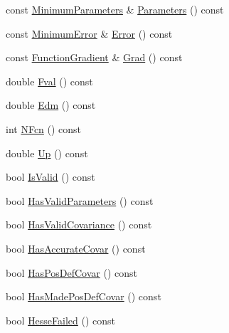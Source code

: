 \begin{DoxyCompactItemize}
\item 
const \mbox{\hyperlink{classROOT_1_1Minuit2_1_1MinimumParameters}{Minimum\+Parameters}} \& \mbox{\hyperlink{classROOT_1_1Minuit2_1_1BasicFunctionMinimum_acbbd51950f390d29541728f114b2d12e}{Parameters}} () const
\item 
const \mbox{\hyperlink{classROOT_1_1Minuit2_1_1MinimumError}{Minimum\+Error}} \& \mbox{\hyperlink{classROOT_1_1Minuit2_1_1BasicFunctionMinimum_a239c3ed3af4e3bc89b25014ec808e229}{Error}} () const
\item 
const \mbox{\hyperlink{classROOT_1_1Minuit2_1_1FunctionGradient}{Function\+Gradient}} \& \mbox{\hyperlink{classROOT_1_1Minuit2_1_1BasicFunctionMinimum_aa071637493e0d415db455c2eec0990c6}{Grad}} () const
\item 
double \mbox{\hyperlink{classROOT_1_1Minuit2_1_1BasicFunctionMinimum_a4ae5abf5eb1cfa1924abad45529e1ffd}{Fval}} () const
\item 
double \mbox{\hyperlink{classROOT_1_1Minuit2_1_1BasicFunctionMinimum_abecb5c249e988f6f3f792e2bcc11d4a4}{Edm}} () const
\item 
int \mbox{\hyperlink{classROOT_1_1Minuit2_1_1BasicFunctionMinimum_a1b73ebb29cc319f09fdd5a4408e703ba}{N\+Fcn}} () const
\item 
double \mbox{\hyperlink{classROOT_1_1Minuit2_1_1BasicFunctionMinimum_a576364a872f31ede72df956b103e0d6e}{Up}} () const
\item 
bool \mbox{\hyperlink{classROOT_1_1Minuit2_1_1BasicFunctionMinimum_a644f34dabb94b0b5bdc8f7b8bfa7ae4b}{Is\+Valid}} () const
\item 
bool \mbox{\hyperlink{classROOT_1_1Minuit2_1_1BasicFunctionMinimum_a91fedd04974dd5d27981eb758405670f}{Has\+Valid\+Parameters}} () const
\item 
bool \mbox{\hyperlink{classROOT_1_1Minuit2_1_1BasicFunctionMinimum_a2bf14deac281ae646e88a2fa6d0b5012}{Has\+Valid\+Covariance}} () const
\item 
bool \mbox{\hyperlink{classROOT_1_1Minuit2_1_1BasicFunctionMinimum_acc1e5d50ec4abe632af93c5dcebd9c0e}{Has\+Accurate\+Covar}} () const
\item 
bool \mbox{\hyperlink{classROOT_1_1Minuit2_1_1BasicFunctionMinimum_a82e819b720ca93301fdea10fc10af791}{Has\+Pos\+Def\+Covar}} () const
\item 
bool \mbox{\hyperlink{classROOT_1_1Minuit2_1_1BasicFunctionMinimum_a57562fcd9f78a8e4f9a425c8f80f1d83}{Has\+Made\+Pos\+Def\+Covar}} () const
\item 
bool \mbox{\hyperlink{classROOT_1_1Minuit2_1_1BasicFunctionMinimum_a8bcb47393d7e39ec1c8fda42974d092f}{Hesse\+Failed}} () const

\end{DoxyCompactItemize}
